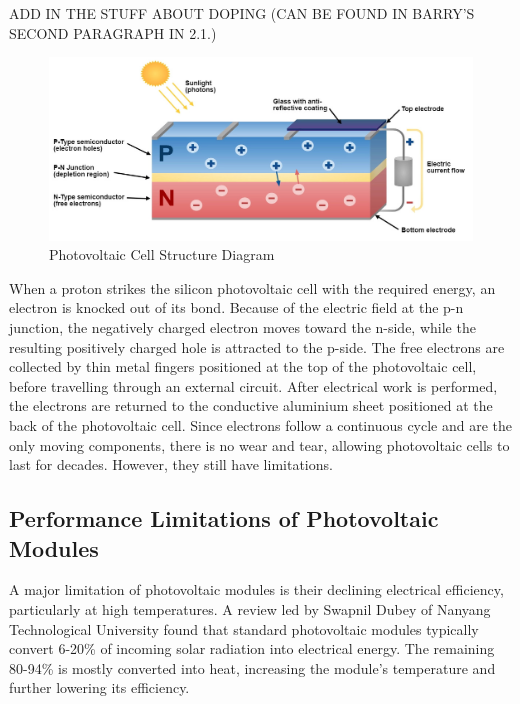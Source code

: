 \noindent ADD IN THE STUFF ABOUT DOPING (CAN BE FOUND IN BARRY'S SECOND PARAGRAPH IN 2.1.)

\begin{figure}[ht]
    \centering
    \includegraphics[width=1\textwidth]{Figures/photovoltaic_cell_diagram.jpg}
    \caption{Photovoltaic Cell Structure Diagram \cite{Gupta2020SolarVehicle}}
    \label{fig:photovoltaic_cell_diagram}
\end{figure}
\FloatBarrier

\noindent When a proton strikes the silicon photovoltaic cell with the required energy, an electron is knocked out of its bond. Because of the electric field at the p-n junction, the negatively charged electron moves toward the n-side, while the resulting positively charged hole is attracted to the p-side. The free electrons are collected by thin metal fingers positioned at the top of the photovoltaic cell, before travelling through an external circuit. After electrical work is performed, the electrons are returned to the conductive aluminium sheet positioned at the back of the photovoltaic cell. Since electrons follow a continuous cycle and are the only moving components, there is no wear and tear, allowing photovoltaic cells to last for decades. \cite{TED-Ed2016HowKomp} However, they still have limitations.\vspace{0.5em}

\pagebreak
\subsection{Performance Limitations of Photovoltaic Modules}
A major limitation of photovoltaic modules is their declining electrical efficiency, particularly at high temperatures. A review led by Swapnil Dubey of Nanyang Technological University found that standard photovoltaic modules typically convert 6-20\% of incoming solar radiation into electrical energy. The remaining 80-94\% is mostly converted into heat, increasing the module’s temperature and further lowering its efficiency. \cite{Dubey2013TemperatureReview}\vspace{0.5em}

